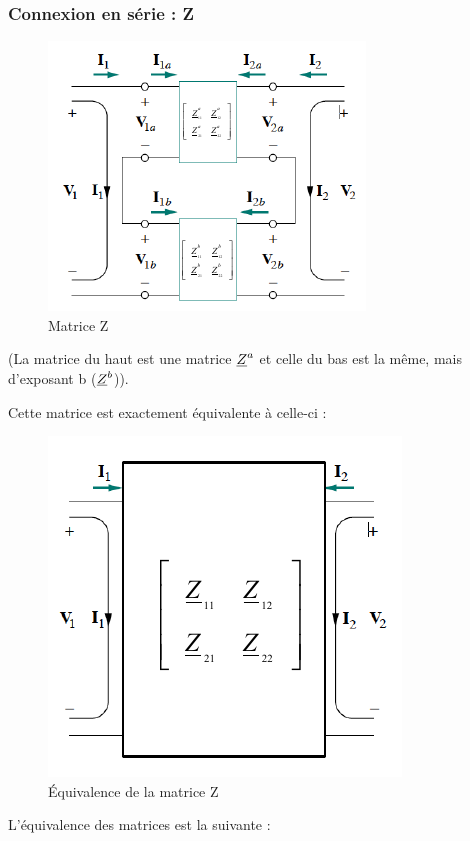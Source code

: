 \documentclass[12pt,a4paper]{article}
\newcommand{\uz}{\uline{Z} }
\begin{document}
\subsubsection{Connexion en série : Z}
\begin{figure}[!h]
	\centering
	\includegraphics[scale=1]{images/matrice_z}
	\caption{Matrice Z}
\end{figure}
(La matrice du haut est une matrice $\uz^a$ et celle du bas est la même, mais d'exposant b ($\uz^b$)). 

Cette matrice est exactement équivalente à celle-ci :
\begin{figure}[!h]
	\centering
	\includegraphics[scale=0.6]{images/matrice_z2}
	\caption{Équivalence de la matrice Z}
\end{figure}

L'équivalence des matrices est la suivante :
\end{document}
